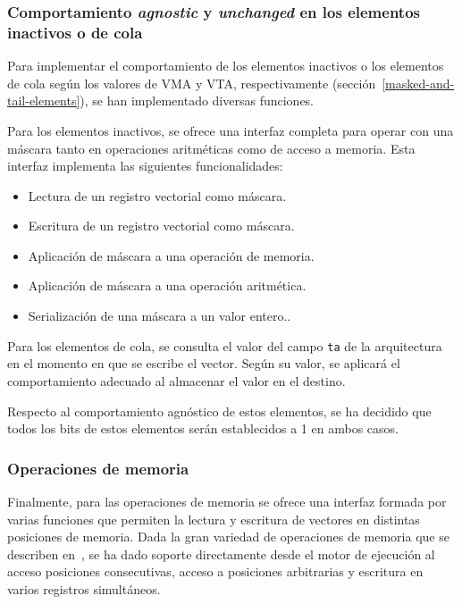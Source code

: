 \subsubsection{Comportamiento \textit{agnostic} y \textit{unchanged} en los elementos inactivos o de cola}

Para implementar el comportamiento de los elementos inactivos o los elementos de cola según los valores de VMA y VTA, respectivamente (sección~\ref{masked-and-tail-elements}), se han implementado diversas funciones.

Para los elementos inactivos, se ofrece una interfaz completa para operar con una máscara tanto en operaciones aritméticas como de acceso a memoria. Esta interfaz implementa las siguientes funcionalidades:
\begin{itemize}
  \item Lectura de un registro vectorial como máscara.
  \item Escritura de un registro vectorial como máscara.
  \item Aplicación de máscara a una operación de memoria.
  \item Aplicación de máscara a una operación aritmética.
  \item Serialización de una máscara a un valor entero..
\end{itemize}

Para los elementos de cola, se consulta el valor del campo \texttt{ta} de la arquitectura en el momento en que se escribe el vector. Según su valor, se aplicará el comportamiento adecuado al almacenar el valor en el destino. 

Respecto al comportamiento agnóstico de estos elementos, se ha decidido que todos los bits de estos elementos serán establecidos a 1 en ambos casos.

\subsubsection{Operaciones de memoria}

Finalmente, para las operaciones de memoria se ofrece una interfaz formada por varias funciones que permiten la lectura y escritura de vectores en distintas posiciones de memoria. Dada la gran variedad de operaciones de memoria que se describen en~\cite{riscv-isa2024}, se ha dado soporte directamente desde el motor de ejecución al acceso posiciones consecutivas, acceso a posiciones arbitrarias y escritura en varios registros simultáneos.



